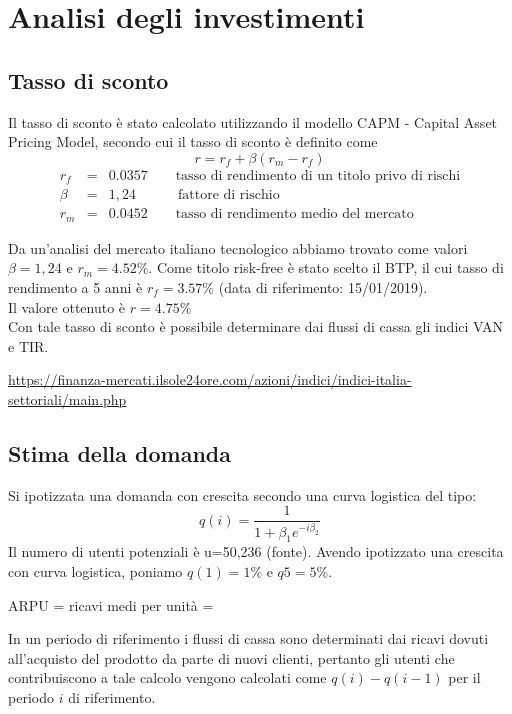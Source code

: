 \section{Analisi degli investimenti}
\subsection{Tasso di sconto} 
Il tasso di sconto è stato calcolato utilizzando il modello CAPM - Capital Asset
Pricing Model, secondo cui il tasso di sconto è definito come
\begin{displaymath}
r = r_f + \beta (r_m - r_f )
\end{displaymath}
\begin{eqnarray*}
r_f &=& 0.0357 \qquad \mbox{tasso di rendimento di un titolo privo di rischi} \\ 
\beta &=& 1,24 \quad\qquad \mbox{fattore di rischio} \\
r_m &=& 0.0452 \qquad \mbox{tasso di rendimento medio del mercato}
\end{eqnarray*}

Da un’analisi del mercato italiano tecnologico abbiamo trovato come valori
$\beta=1,24$ e $r_m=4.52\%$. Come titolo risk-free è stato scelto il BTP, il cui
tasso di rendimento a 5 anni è $r_f=3.57\%$ (data di riferimento: 15/01/2019).\\
Il valore ottenuto è $r = 4.75\%$\\
Con tale tasso di sconto è possibile determinare dai flussi di cassa gli indici
VAN e TIR.

\url{https://finanza-mercati.ilsole24ore.com/azioni/indici/indici-italia-settoriali/main.php}

\subsection{Stima della domanda}
Si ipotizzata una domanda con crescita secondo una curva logistica del tipo: 
\begin{displaymath}
q(i) = \frac{1}{1 + \beta_1 e^{-i\beta_2}}
\end{displaymath}
Il numero di utenti potenziali è u=50,236 (fonte).
Avendo ipotizzato una crescita con curva logistica, poniamo $q(1)=1\%$ e
$q5=5\%$.

ARPU = ricavi medi per unità =

In un periodo di riferimento i flussi di cassa sono determinati dai ricavi
dovuti all’acquisto del prodotto da parte di nuovi clienti, pertanto gli utenti
che contribuiscono a tale calcolo vengono calcolati come $q(i) - q(i-1)$ per il
periodo $i$ di riferimento.

